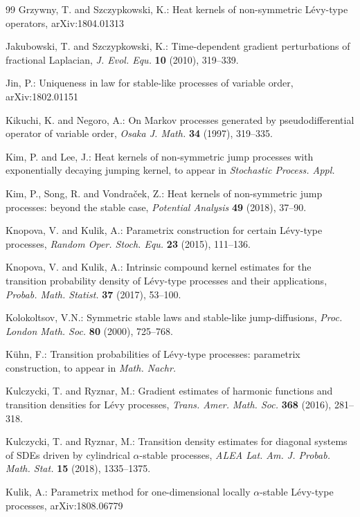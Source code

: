 \documentclass[a4paper,11pt]{amsart}
\theoremstyle{definition}
\begin{document}
\begin{thebibliography}{99}
  Grzywny, T. and Szczypkowski, K.:
Heat kernels of non-symmetric L\'evy-type operators, arXiv:1804.01313

 Jakubowski, T. and Szczypkowski, K.:
Time-dependent gradient perturbations of fractional Laplacian, \emph{J. Evol. Equ.} \textbf{10} (2010), 319--339.

 Jin, P.: Uniqueness in law for stable-like processes of variable order,
arXiv:1802.01151

Kikuchi, K. and Negoro, A.: On Markov processes generated by pseudodifferential operator of
variable order, \emph{Osaka J. Math.} \textbf{34} (1997), 319--335.

Kim, P. and Lee, J.: Heat kernels of non-symmetric jump processes with exponentially decaying jumping kernel, to appear in  \emph{Stochastic Process. Appl.}

Kim, P., Song, R. and Vondra\v{c}ek, Z.: Heat kernels of non-symmetric jump processes:
beyond the stable case, \emph{Potential Analysis} \textbf{49} (2018), 37--90.


Knopova, V. and Kulik, A.: Parametrix construction for certain
L\'evy-type processes, \emph{Random Oper. Stoch. Equ.} \textbf{23}
(2015), 111--136.

 Knopova, V. and Kulik, A.: Intrinsic compound kernel
estimates for the transition probability density of L\'evy-type
processes and their applications, \emph{Probab. Math. Statist.}
\textbf{37} (2017), 53--100.


Kolokoltsov, V.N.: Symmetric stable laws and stable-like jump-diffusions, \emph{Proc.
London Math. Soc.} \textbf{80} (2000), 725--768.


K\"{u}hn, F.: Transition probabilities of L\'evy-type processes: parametrix construction, to appear in \emph{Math. Nachr.}

 Kulczycki, T. and Ryznar, M.: Gradient estimates of harmonic functions and transition densities for L\'evy processes,
 \emph{Trans. Amer. Math. Soc.} \textbf{368} (2016), 281--318.


 Kulczycki, T. and Ryznar, M.: Transition density estimates for diagonal systems of SDEs driven by cylindrical $\alpha$-stable processes,
\emph{ALEA Lat. Am. J. Probab. Math. Stat.} \textbf{15} (2018), 1335--1375.

 Kulik, A.: Parametrix method for one-dimensional locally $\alpha$-stable L\'evy-type processes, arXiv:1808.06779


\end{thebibliography}
\end{document}
